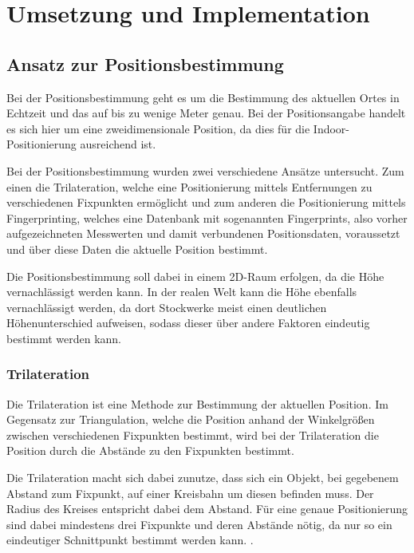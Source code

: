 \chapter{Umsetzung und Implementation}
\label{chap:implementation}

\section{Ansatz zur Positionsbestimmung}
\label{sec:implementation:positioning}
Bei der Positionsbestimmung geht es um die Bestimmung des aktuellen Ortes in Echtzeit und das auf bis zu wenige Meter genau. Bei der Positionsangabe handelt es sich hier um eine zweidimensionale Position, da dies für die Indoor-Positionierung ausreichend ist.

Bei der Positionsbestimmung wurden zwei verschiedene Ansätze untersucht. Zum einen die Trilateration, welche eine Positionierung mittels Entfernungen zu verschiedenen Fixpunkten ermöglicht und zum anderen die Positionierung mittels Fingerprinting, welches eine Datenbank mit sogenannten Fingerprints, also vorher aufgezeichneten Messwerten und damit verbundenen Positionsdaten, voraussetzt und über diese Daten die aktuelle Position bestimmt.

Die Positionsbestimmung soll dabei in einem 2D-Raum erfolgen, da die Höhe vernachlässigt werden kann. In der realen Welt kann die Höhe ebenfalls vernachlässigt werden, da dort Stockwerke meist einen deutlichen Höhenunterschied aufweisen, sodass dieser über andere Faktoren eindeutig bestimmt werden kann.

\subsection{Trilateration}
\label{sec:implementation:trilateration}
Die Trilateration ist eine Methode zur Bestimmung der aktuellen Position. Im Gegensatz zur Triangulation, welche die Position anhand der Winkelgrößen zwischen verschiedenen Fixpunkten bestimmt, wird bei der Trilateration die Position durch die Abstände zu den Fixpunkten bestimmt. 

Die Trilateration macht sich dabei zunutze, dass sich ein Objekt, bei gegebenem Abstand zum Fixpunkt, auf einer Kreisbahn um diesen befinden muss. Der Radius des Kreises entspricht dabei dem Abstand. Für eine genaue Positionierung sind dabei mindestens drei Fixpunkte und deren Abstände nötig, da nur so ein eindeutiger Schnittpunkt bestimmt werden kann. \cite{wlanposlateration}.

